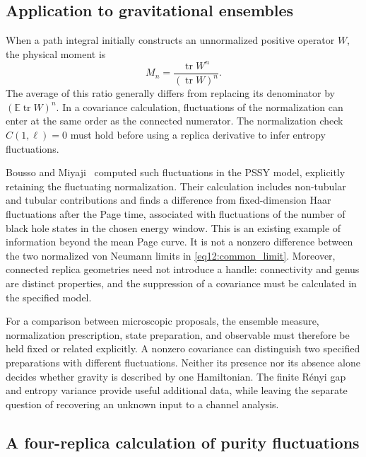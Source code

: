 \documentclass[11pt,letterpaper]{article}
\theoremstyle{plain}
\theoremstyle{definition}
\theoremstyle{remark}
\newcommand{\E}{\mathbb{E}}
\DeclareMathOperator{\tr}{tr}
\begin{document}
\subsection{Application to gravitational ensembles}
\label{subsec12:interpretation}

When a path integral initially constructs an unnormalized positive
operator $W$, the physical moment is
\begin{equation}
 M_n=\frac{\tr W^n}{(\tr W)^n}.
 \label{eq12:normalized_ratio}
\end{equation}
The average of this ratio generally differs from replacing its
denominator by $(\E\tr W)^n$.  In a covariance calculation, fluctuations
of the normalization can enter at the same order as the connected
numerator.  The normalization check $C(1,\ell)=0$ must hold before
using a replica derivative to infer entropy fluctuations.

Bousso and Miyaji~\citep{boussomiyaji2024} computed such fluctuations
in the PSSY model, explicitly retaining the fluctuating normalization.
Their calculation includes non-tubular and tubular contributions and
finds a difference from fixed-dimension Haar fluctuations after the
Page time, associated with fluctuations of the number of black hole
states in the chosen energy window.  This is an existing example of
information beyond the mean Page curve.  It is not a nonzero difference
between the two normalized von Neumann limits in
\eqref{eq12:common_limit}.  Moreover, connected replica geometries
need not introduce a handle: connectivity and genus are distinct
properties, and the suppression of a covariance must be calculated
in the specified model.

For a comparison between microscopic proposals, the ensemble measure,
normalization prescription, state preparation, and observable must
therefore be held fixed or related explicitly.  A nonzero covariance
can distinguish two specified preparations with different fluctuations.
Neither its presence nor its absence alone decides whether gravity is
described by one Hamiltonian.  The finite R\'enyi gap and entropy variance
provide useful additional data, while leaving the separate question of
recovering an unknown input to a channel analysis.


\subsection{A four-replica calculation of purity fluctuations}
\label{subsec12:four_replicas}
\end{document}
